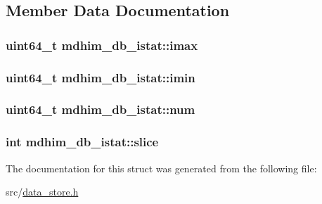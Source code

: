 \subsection{Member Data Documentation}
\hypertarget{structmdhim__db__istat_a9e6b79101a083afc00c3ccc47cfc96d6}{
\subsubsection[{imax}]{\setlength{\rightskip}{0pt plus 5cm}uint64\-\_\-t mdhim\-\_\-db\-\_\-istat\-::imax}}\label{structmdhim__db__istat_a9e6b79101a083afc00c3ccc47cfc96d6}
\hypertarget{structmdhim__db__istat_a6b2cfaa0eab14f94924d79c8b722aad8}{
\subsubsection[{imin}]{\setlength{\rightskip}{0pt plus 5cm}uint64\-\_\-t mdhim\-\_\-db\-\_\-istat\-::imin}}\label{structmdhim__db__istat_a6b2cfaa0eab14f94924d79c8b722aad8}
\hypertarget{structmdhim__db__istat_a18e1713a8ca30875d6cd914b11e8a70e}{
\subsubsection[{num}]{\setlength{\rightskip}{0pt plus 5cm}uint64\-\_\-t mdhim\-\_\-db\-\_\-istat\-::num}}\label{structmdhim__db__istat_a18e1713a8ca30875d6cd914b11e8a70e}
\hypertarget{structmdhim__db__istat_aa478e3ac191e0899e25f312d8aa33b41}{
\subsubsection[{slice}]{\setlength{\rightskip}{0pt plus 5cm}int mdhim\-\_\-db\-\_\-istat\-::slice}}\label{structmdhim__db__istat_aa478e3ac191e0899e25f312d8aa33b41}


The documentation for this struct was generated from the following file\-:\begin{DoxyCompactItemize}
\item 
src/\hyperlink{data__store_8h}{data\-\_\-store.\-h}\end{DoxyCompactItemize}
